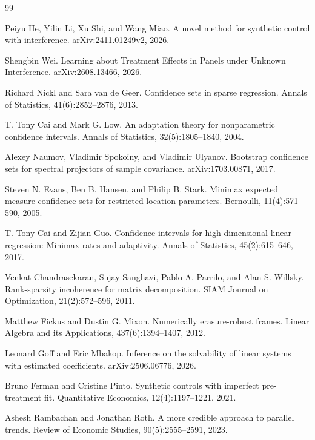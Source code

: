 \documentclass{article}
\begin{document}
\begin{thebibliography}{99}

   Peiyu He, Yilin Li, Xu Shi, and Wang Miao. A novel method for synthetic control with interference. arXiv:2411.01249v2, 2026.

   Shengbin Wei. Learning about Treatment Effects in Panels under Unknown Interference. arXiv:2608.13466, 2026.

   Richard Nickl and Sara van de Geer. Confidence sets in sparse regression. Annals of Statistics, 41(6):2852--2876, 2013.

   T. Tony Cai and Mark G. Low. An adaptation theory for nonparametric confidence intervals. Annals of Statistics, 32(5):1805--1840, 2004.

   Alexey Naumov, Vladimir Spokoiny, and Vladimir Ulyanov. Bootstrap confidence sets for spectral projectors of sample covariance. arXiv:1703.00871, 2017.

   Steven N. Evans, Ben B. Hansen, and Philip B. Stark. Minimax expected measure confidence sets for restricted location parameters. Bernoulli, 11(4):571--590, 2005.

   T. Tony Cai and Zijian Guo. Confidence intervals for high-dimensional linear regression: Minimax rates and adaptivity. Annals of Statistics, 45(2):615--646, 2017.

   Venkat Chandrasekaran, Sujay Sanghavi, Pablo A. Parrilo, and Alan S. Willsky. Rank-sparsity incoherence for matrix decomposition. SIAM Journal on Optimization, 21(2):572--596, 2011.

   Matthew Fickus and Dustin G. Mixon. Numerically erasure-robust frames. Linear Algebra and its Applications, 437(6):1394--1407, 2012.

   Leonard Goff and Eric Mbakop. Inference on the solvability of linear systems with estimated coefficients. arXiv:2506.06776, 2026.

   Bruno Ferman and Cristine Pinto. Synthetic controls with imperfect pre-treatment fit. Quantitative Economics, 12(4):1197--1221, 2021.

   Ashesh Rambachan and Jonathan Roth. A more credible approach to parallel trends. Review of Economic Studies, 90(5):2555--2591, 2023.

\end{thebibliography}
\end{document}
